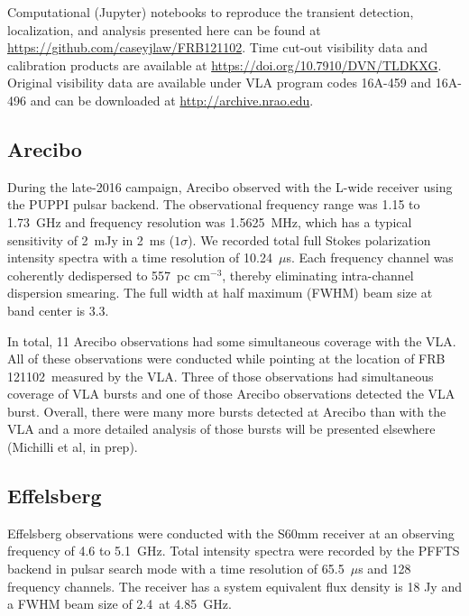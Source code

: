 \documentclass[twocolumn]{aastex61}
\newcommand{\frb}{FRB 121102}
\begin{document}
Computational (Jupyter) notebooks to reproduce the transient detection, localization, and analysis presented here can be found at \url{https://github.com/caseyjlaw/FRB121102}. Time cut-out visibility data and calibration products are available at \url{https://doi.org/10.7910/DVN/TLDKXG}. Original visibility data are available under VLA program codes 16A-459 and 16A-496 and can be downloaded at \url{http://archive.nrao.edu}.

\subsection{Arecibo}

During the late-2016 campaign, Arecibo observed with the L-wide receiver using the PUPPI pulsar backend. The observational frequency range was 1.15 to 1.73~GHz and frequency resolution was 1.5625~MHz, which has a typical sensitivity of 2~mJy in 2~ms ($1\sigma$). We recorded total full Stokes polarization intensity spectra with a time resolution of 10.24~$\mu$s. Each frequency channel was coherently dedispersed to 557~pc cm$^{-3}$, thereby eliminating intra-channel dispersion smearing. The full width at half maximum (FWHM) beam size at band center is 3.3\arcmin.

In total, 11 Arecibo observations had some simultaneous coverage with the VLA. All of these observations were conducted while pointing at the location of \frb\ measured by the VLA. Three of those observations had simultaneous coverage of VLA bursts and one of those Arecibo observations detected the VLA burst. 
Overall, there were many more bursts detected at Arecibo than with the VLA and a more detailed analysis of those bursts will be presented elsewhere (Michilli et al, in prep).

\subsection{Effelsberg}

Effelsberg observations were conducted with the S60mm receiver at an observing frequency of 4.6 to 5.1~GHz. Total intensity spectra were recorded by the PFFTS backend in pulsar search mode with a time resolution of 65.5~$\mu$s and 128 frequency channels. The receiver has a system equivalent flux density is 18 Jy and a FWHM beam size of 2.4\arcmin\ at 4.85~GHz. 
\end{document}
